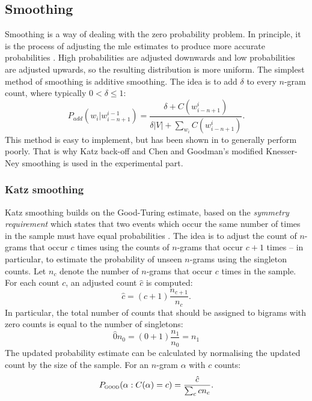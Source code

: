 	\subsection{Smoothing}
	\label{subsection:smoothing}
	Smoothing is a way of dealing with the zero probability problem. In principle, it is the process of adjusting the \gls{mle} estimates to produce more accurate probabilities \cite{chen1996empirical}. High probabilities are adjusted downwards and low probabilities are adjusted upwards, so the resulting distribution is more uniform. The simplest method of smoothing is additive smoothing. The idea is to add $\delta$ to every $n$-gram count, where typically $0 < \delta \leq 1$:
	\begin{equation}
		P_{add}(w_{i}|w_{i-n+1}^{i-1})=\frac{\delta+C(w_{i-n+1}^{i})}{\delta|V|+\sum_{w_{i}}C(w_{i-n+1}^{i})}.
	\end{equation}
	This method is easy to implement, but has been shown in \cite{Gale94what'swrong} to generally perform poorly. That is why Katz back-off and Chen and Goodman's modified Knesser-Ney smoothing is used in the experimental part.
	\subsubsection*{Katz smoothing}
	Katz smoothing builds on the Good-Turing estimate, based on the \textit{symmetry requirement} which states that two events which occur the same number of times in the sample must have equal probabilities \cite{whittaker2000statistical}. The idea is to adjust the count of $n$-grams that occur $c$ times using the counts of $n$-grams that occur $c+1$ times -- in particular, to estimate the probability of unseen $n$-grams using the singleton counts. Let $n_{c}$ denote the number of $n$-grams that occur $c$ times in the sample. For each count $c$, an adjusted count $\hat{c}$ is computed:
	\begin{equation}
		\hat{c}=(c+1)\frac{n_{c+1}}{n_{c}}.
	\end{equation}
	In particular, the total number of counts that should be assigned to bigrams with zero counts is equal to the number of singletons:
	\begin{equation}
		\label{equation:good-turing}
		\hat{0}n_{0}=(0+1)\frac{n_{1}}{n_{0}}=n_{1}
	\end{equation}
	The updated probability estimate can be calculated by normalising the updated count by the size of the sample. For an $n$-gram $\alpha$ with $c$ counts:
	\begin{equation}
		P_{\textsc{good}}(\alpha:C(\alpha)=c)=\frac{\hat{c}}{\sum_{c}cn_{c}}.
	\end{equation}

